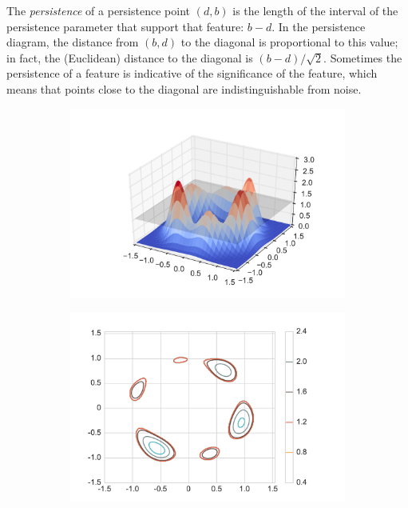 \documentclass[12pt]{article}
\begin{document}
The \emph{persistence} of a persistence point $(d,b)$ is the length of the interval of the persistence parameter that support that feature: $b-d$.  In the persistence diagram, the distance from $(b,d)$ to the diagonal is proportional to this value; in fact, the (Euclidean) distance to the diagonal is $(b-d)/\sqrt{2}$. Sometimes the persistence of a feature is indicative of the
significance of the feature, which means that points close to the diagonal are indistinguishable from noise.

\begin{figure}
  \begin{subfigure}{.27\linewidth}
    \centering
    \caption{}  
        \includegraphics[width=\linewidth]{figure_2_3d_repr.pdf}
    \label{fig:example_3d}
  \end{subfigure}
    \begin{subfigure}{.25\linewidth}
    \centering
    \caption{}  
        \includegraphics[width=\linewidth]{figure_2_contour_1.pdf}

\end{subfigure}
\end{figure}
\end{document}
